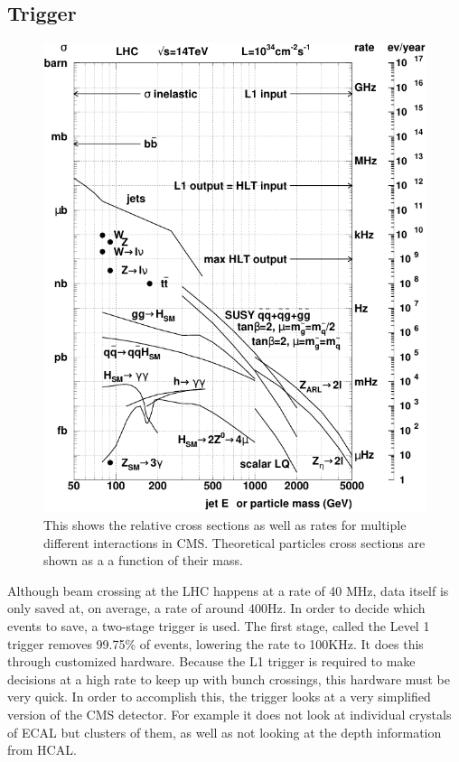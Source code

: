 \subsection{Trigger}
\label{Sec:Trigger}
\begin{figure}[!htbp]
    \centering
    \includegraphics{figures/ExperimentFigures/rates_lhc.pdf}
    \caption[Cross sections in the LHC]{This shows the relative cross sections as well as rates for multiple different interactions in CMS. Theoretical particles cross sections are shown as a a function of their mass.}
    \label{fig:Rates}
\end{figure}
Although beam crossing at the LHC happens at a rate of 40 MHz, data itself is only saved at, on average, a rate of around 400Hz. In order to decide which events to save, a two-stage trigger is used. The first stage, called the Level 1 trigger removes 99.75\% of events, lowering the rate to 100KHz. It does this through customized hardware. Because the L1 trigger is required to make decisions at a high rate to keep up with bunch crossings, this hardware must be very quick. In order to accomplish this, the trigger looks at a very simplified version of the CMS detector. For example it does not look at individual crystals of ECAL but clusters of them, as well as not looking at the depth information from HCAL. 

